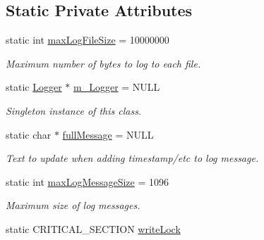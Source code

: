 \subsection*{Static Private Attributes}
\begin{DoxyCompactItemize}
\item 
\hypertarget{class_logger_add521d8f1e6b2cf5074f1d4c02127736}{
static int \hyperlink{class_logger_add521d8f1e6b2cf5074f1d4c02127736}{maxLogFileSize} = 10000000}
\label{class_logger_add521d8f1e6b2cf5074f1d4c02127736}

\begin{DoxyCompactList}\small\item\em Maximum number of bytes to log to each file. \end{DoxyCompactList}\item 
\hypertarget{class_logger_a9818e071f2bba3d51d28781de9b80e4b}{
static \hyperlink{class_logger}{Logger} $\ast$ \hyperlink{class_logger_a9818e071f2bba3d51d28781de9b80e4b}{m\_\-Logger} = NULL}
\label{class_logger_a9818e071f2bba3d51d28781de9b80e4b}

\begin{DoxyCompactList}\small\item\em Singleton instance of this class. \end{DoxyCompactList}\item 
\hypertarget{class_logger_af6934b5607ef66ab1a80cd2c43557e7d}{
static char $\ast$ \hyperlink{class_logger_af6934b5607ef66ab1a80cd2c43557e7d}{fullMessage} = NULL}
\label{class_logger_af6934b5607ef66ab1a80cd2c43557e7d}

\begin{DoxyCompactList}\small\item\em Text to update when adding timestamp/etc to log message. \end{DoxyCompactList}\item 
\hypertarget{class_logger_a2dbf94ee9b3fff1716ae7773a371c83b}{
static int \hyperlink{class_logger_a2dbf94ee9b3fff1716ae7773a371c83b}{maxLogMessageSize} = 1096}
\label{class_logger_a2dbf94ee9b3fff1716ae7773a371c83b}

\begin{DoxyCompactList}\small\item\em Maximum size of log messages. \end{DoxyCompactList}\item 
\hypertarget{class_logger_ab59fb2de62d8f5bcf7b188c295e17094}{
static CRITICAL\_\-SECTION \hyperlink{class_logger_ab59fb2de62d8f5bcf7b188c295e17094}{writeLock}}
\label{class_logger_ab59fb2de62d8f5bcf7b188c295e17094}


\end{DoxyCompactItemize}
